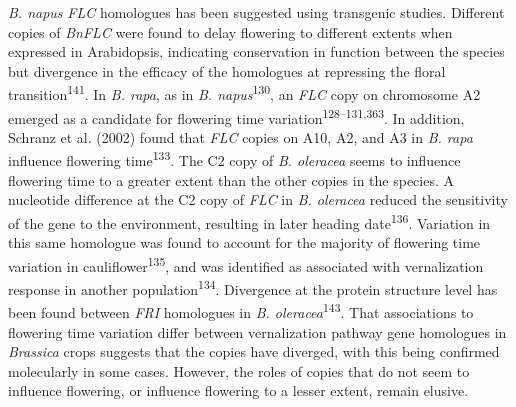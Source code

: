 \documentclass[12pt,]{book}
\begin{document}
\emph{B. napus} \emph{FLC} homologues has been suggested using
transgenic studies. Different copies of \emph{BnFLC} were found to delay
flowering to different extents when expressed in Arabidopsis, indicating
conservation in function between the species but divergence in the
efficacy of the homologues at repressing the floral
transition\textsuperscript{141}. In \emph{B. rapa}, as in \emph{B.
napus}\textsuperscript{130}, an \emph{FLC} copy on chromosome A2 emerged
as a candidate for flowering time
variation\textsuperscript{128--131,363}. In addition, Schranz et al.
(2002) found that \emph{FLC} copies on A10, A2, and A3 in \emph{B. rapa}
influence flowering time\textsuperscript{133}. The C2 copy of \emph{B.
oleracea} seems to influence flowering time to a greater extent than the
other copies in the species. A nucleotide difference at the C2 copy of
\emph{FLC} in \emph{B. oleracea} reduced the sensitivity of the gene to
the environment, resulting in later heading date\textsuperscript{136}.
Variation in this same homologue was found to account for the majority
of flowering time variation in cauliflower\textsuperscript{135}, and was
identified as associated with vernalization response in another
population\textsuperscript{134}. Divergence at the protein structure
level has been found between \emph{FRI} homologues in \emph{B.
oleracea}\textsuperscript{143}. That associations to flowering time
variation differ between vernalization pathway gene homologues in
\emph{Brassica} crops suggests that the copies have diverged, with this
being confirmed molecularly in some cases. However, the roles of copies
that do not seem to influence flowering, or influence flowering to a
lesser extent, remain elusive.
\end{document}
